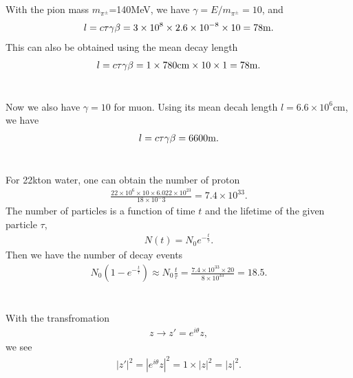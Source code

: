 \documentclass[11pt]{article}
\begin{document}
\section{ }
With the pion mass $m_{\pi^{\pm}}$=140MeV, we have $\gamma=E/m_{\pi^{\pm}}=10$, and
\begin{eqnarray}
l=c \tau \gamma \beta = 3 \times 10^8 \times 2.6\times 10^{-8} \times 10 = 78 {\rm m}.
\end{eqnarray}
This can also be obtained using the mean decay length
\begin{eqnarray}
  l=c \tau \gamma \beta = 1 \times 780 {\rm cm} \times 10 \times 1=78 {\rm m}.
\end{eqnarray}

\section{ }
Now we also have $\gamma=10$ for muon. Using its mean decah length $l=6.6 \times 10^6$cm, we have
\begin{eqnarray}
  l=c \tau \gamma \beta= 6600 {\rm m}.
\end{eqnarray}

\section{ }
For 22kton water, one can obtain the number of proton
\begin{eqnarray}
  \frac {22 \times 10^6 \times 10 \times 6.022 \times 10^{23}}{18 \times 10^-3}=7.4 \times 10^{33}.
\end{eqnarray}
The number of particles is a function of time $t$ and the lifetime of the given particle $\tau$,
\begin{eqnarray}
  N(t)=N_0 e^{-\frac{t}{\tau}}.
\end{eqnarray}
Then we have the number of decay events
\begin{eqnarray}
  N_0 (1-e^{-\frac{t}{\tau}}) \approx N_0 \frac{t}{\tau}=\frac {7.4 \times 10^{33} \times 20}{8 \times 10^{33}}=18.5.
\end{eqnarray}

\section{ }
With the transfromation
\begin{eqnarray}
  z \to z'=e^{i \theta} z,
\end{eqnarray}
we see
\begin{eqnarray}
  |z'|^2=|e^{i \theta} z|^2=1\times |z|^2=|z|^2.
\end{eqnarray}
\end{document}
